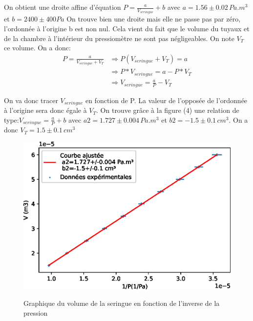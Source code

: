 \documentclass[12pt]{article}
\begin{document}
On obtient une droite affine d'équation $P=\frac{a}{V_{seringue}}+b$ avec $a=1.56\pm 0.02\, Pa.m^3$ et $b=2400\pm 400 Pa$
On trouve bien une droite mais elle ne passe pas par zéro, l'ordonnée à l'origine b est non nul. Cela vient du fait que le volume du tuyaux et de la chambre à l'intérieur du pressiomètre ne sont pas négligeables. On note $V_T$ ce volume. On a donc:
\begin{align*}
P=\frac{a}{V_{seringue}+V_T}&\Rightarrow P(V_{seringue}+V_T)=a \\
	&\Rightarrow P*V_{seringue}=a-P*V_T \\
	&\Rightarrow V_{seringue}=\frac{a}{P}-V_T
\end{align*}

On va donc tracer $V_{seringue}$ en fonction de P. La valeur de l'opposée de l'ordonnée à l'origine sera donc égale à $V_T$. On trouve grâce à la figure (4) une relation de type:$V_{seringue}=\frac{a}{P}+b$ avec $a2=1.727\pm0.004\, Pa.m^3$ et $b2=-1.5\pm 0.1\, cm^3$. On a donc $V_T=1.5\pm 0.1\, cm^3$

\newpage
\begin{figure}[h!]
	\begin{center}
		\includegraphics[scale=0.9]{img/G2Exp1.eps}
		\label{Graphique 2 Exp1}
		\caption{Graphique du volume de la seringue en fonction de l'inverse de la pression}
	\end{center}
\end{figure}
\end{document}
